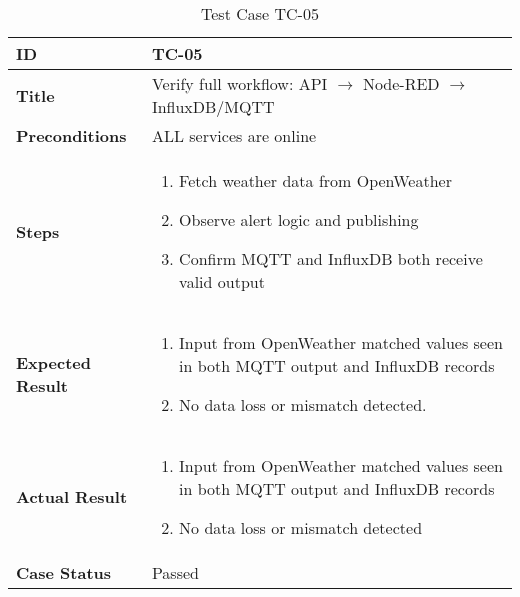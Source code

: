 \begin{table}[ht]
\centering
\begin{tabular}{|>{\raggedright\arraybackslash}p{4cm}|p{10cm}|}
\hline
\textbf{ID} & TC-05 \\
\hline
\textbf{Title} & Verify full workflow: API $\rightarrow$ Node-RED $\rightarrow$ InfluxDB/MQTT \\
\hline
\textbf{Preconditions} & ALL services are online \\
\hline
\textbf{Steps} & \vspace{-20pt}\begin{enumerate}
    \item Fetch weather data from OpenWeather
    \item Observe alert logic and publishing
    \item Confirm MQTT and InfluxDB both receive valid output
\end{enumerate} \\
\hline
\textbf{Expected Result} & \vspace{-20pt}\begin{enumerate}
    \item Input from OpenWeather matched values seen in both MQTT output and InfluxDB records
    \item No data loss or mismatch detected.
\end{enumerate} \\
\hline
\textbf{Actual Result} & \vspace{-20pt}\begin{enumerate}
    \item Input from OpenWeather matched values seen in both MQTT output and InfluxDB records
    \item No data loss or mismatch detected
\end{enumerate} \\
\hline
\textbf{Case Status} & Passed \\
\hline
\end{tabular}
\caption{Test Case TC-05}
\label{tab:tc5}
\end{table}